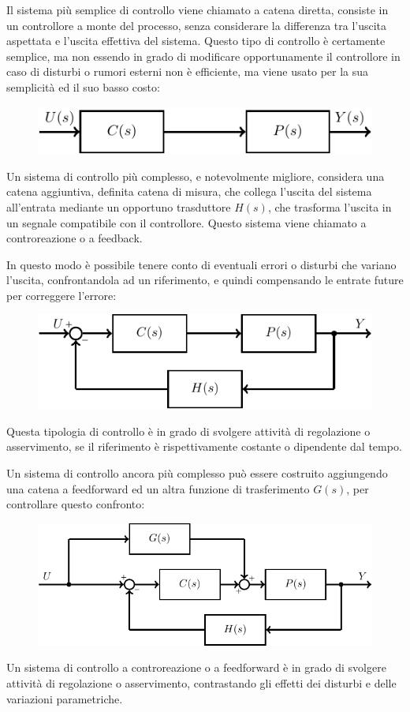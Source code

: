 \documentclass{article}
\numberwithin{equation}{subsection}
\begin{document}
Il sistema più semplice di controllo viene chiamato a catena diretta, consiste in un controllore a monte del processo, senza considerare la differenza tra l'uscita aspettata 
e l'uscita effettiva del sistema. Questo tipo di controllo è certamente semplice, ma non essendo in grado di modificare opportunamente il controllore in caso di disturbi o 
rumori esterni non è efficiente, ma viene usato per la sua semplicità ed il suo basso costo: 
\begin{figure}[H]%
    \centering
    \includegraphics{controllore-1.pdf}%
\end{figure}
Un sistema di controllo più complesso, e notevolmente migliore, considera una catena aggiuntiva, definita catena di misura, che collega l'uscita del sistema all'entrata 
mediante un opportuno trasduttore $H(s)$, che trasforma l'uscita in un segnale compatibile con il controllore. Questo sistema viene chiamato a controreazione o a feedback. 

In questo modo è possibile tenere conto di eventuali 
errori o disturbi che variano l'uscita, confrontandola ad un riferimento, e quindi compensando le entrate future per correggere l'errore: 
\begin{figure}[H]%
    \centering
    \includegraphics{controreazione-2.pdf}%
\end{figure}
Questa tipologia di controllo è 
in grado di svolgere attività di regolazione o asservimento, se il riferimento è rispettivamente costante o dipendente dal tempo. 

Un sistema di controllo ancora più complesso può essere costruito aggiungendo una catena a feedforward ed un altra funzione di trasferimento $G(s)$, per 
controllare questo confronto: 
\begin{figure}[H]%
    \centering
    \includegraphics{controreazione-3.pdf}%
\end{figure}
Un sistema di controllo a controreazione o a feedforward è in grado di svolgere attività di regolazione o asservimento, contrastando gli effetti dei disturbi e 
delle variazioni parametriche. 
\end{document}
